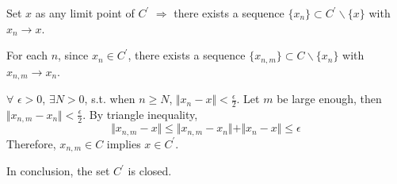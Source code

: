 \documentclass[11pt,letter,notitlepage]{article}
\theoremstyle{definition}
\begin{document}
\begin{solution}
\begin{enumerate}
\begin{enumerate}
	Set $x$ as any limit point of $C^{\prime}$ $\Longrightarrow$ there exists a sequence $\{x_n\} \subset C^{\prime}\backslash \{x\}$ with $x_n \rightarrow x$.

	For each $n$, since $x_n \in C^{\prime}$, there exists a sequence $\{x_{n,m}\} \subset C\backslash\{x_n\}$ with $x_{n,m} \rightarrow x_n$.

	$\forall$ $\epsilon > 0$, $\exists N>0$, s.t. when $n \geq N$, $\Vert x_n - x \Vert < \frac{\epsilon}{2}$. Let $m$ be large enough, then $\Vert x_{n,m} - x_n \Vert < \frac{\epsilon}{2}$. By triangle inequality,
	\[
	\Vert x_{n,m} - x \Vert \leq \Vert x_{n,m} - x_n \Vert + \Vert x_n - x \Vert \leq \epsilon
	\]
	Therefore, $x_{n,m} \in C$ implies $x\in C^{\prime}$.

	In conclusion, the set $C^{\prime}$ is closed.
\end{enumerate}
\end{enumerate}
\end{solution}

\newpage
\end{document}
